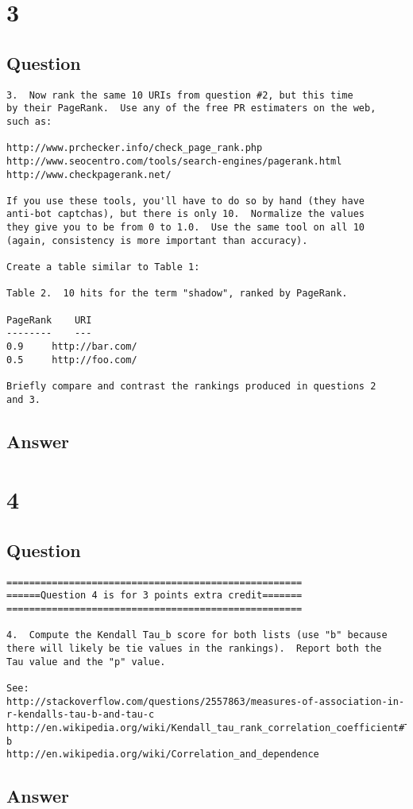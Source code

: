 \documentclass[letterpaper,11pt]{article}
\begin{document}
\begin{verbatim}

\end{verbatim}

\newpage
\section*{3}

\subsection*{Question}

\begin{verbatim}
3.  Now rank the same 10 URIs from question #2, but this time 
by their PageRank.  Use any of the free PR estimaters on the web,
such as:

http://www.prchecker.info/check_page_rank.php
http://www.seocentro.com/tools/search-engines/pagerank.html
http://www.checkpagerank.net/

If you use these tools, you'll have to do so by hand (they have
anti-bot captchas), but there is only 10.  Normalize the values
they give you to be from 0 to 1.0.  Use the same tool on all 10
(again, consistency is more important than accuracy).

Create a table similar to Table 1:

Table 2.  10 hits for the term "shadow", ranked by PageRank.

PageRank	URI
--------	---
0.9		http://bar.com/
0.5		http://foo.com/

Briefly compare and contrast the rankings produced in questions 2
and 3.
\end{verbatim}

\newpage
\subsection*{Answer}

\newpage
\section*{4}

\subsection*{Question}

\begin{verbatim}
====================================================
======Question 4 is for 3 points extra credit=======
====================================================

4.  Compute the Kendall Tau_b score for both lists (use "b" because
there will likely be tie values in the rankings).  Report both the
Tau value and the "p" value.

See: 
http://stackoverflow.com/questions/2557863/measures-of-association-in-r-kendalls-tau-b-and-tau-c
http://en.wikipedia.org/wiki/Kendall_tau_rank_correlation_coefficient#Tau-b
http://en.wikipedia.org/wiki/Correlation_and_dependence
\end{verbatim}

\newpage
\subsection*{Answer}
\end{document}
